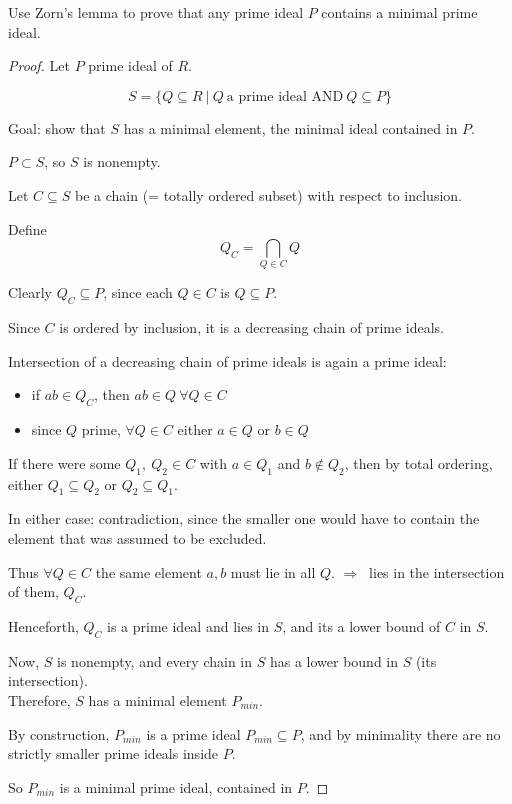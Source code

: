 \documentclass{article}
\theoremstyle{definition}
\newenvironment{ex}[1]
{\renewcommand\theinnerex{#1}\innerex}
{\endinnerex}
\begin{document}
\begin{ex}{R.1.18}
  Use Zorn's lemma to prove that any prime ideal $P$ contains a minimal prime ideal.
\end{ex}
\begin{proof}
  Let $P$ prime ideal of $R$.

  $$S = \{ Q \subseteq R ~|~ Q ~\text{a prime ideal AND}~ Q \subseteq P \}$$

  Goal: show that $S$ has a minimal element, the minimal ideal contained in $P$.

  $P \subset S$, so $S$ is nonempty.

  Let $C \subseteq S$ be a chain (= totally ordered subset) with respect to inclusion.

  Define
  $$Q_C = \bigcap_{Q \in C} Q$$

  Clearly $Q_C \subseteq P$, since each $Q \in C$ is $Q \subseteq P$.

  Since $C$ is ordered by inclusion, it is a decreasing chain of prime ideals.

  Intersection of a decreasing chain of prime ideals is again a prime ideal:
  \begin{itemize}
    \item[-] if $ab \in Q_C$, then $ab \in Q ~\forall Q \in C$
    \item[-] since $Q$ prime, $\forall Q \in C$ either $a \in Q$ or $b \in Q$
  \end{itemize}

  If there were some $Q_1,~ Q_2 \in C$ with $a \in Q_1$ and $b \not\in Q_2$, then by total ordering, either $Q_1 \subseteq Q_2$ or $Q_2 \subseteq Q_1$.

  In either case: contradiction, since the smaller one would have to contain the element that was assumed to be excluded.

  Thus $\forall Q \in C$ the same element $a, b$ must lie in all $Q$. $\Longrightarrow~$ lies in the intersection of them, $Q_C$.

  Henceforth, $Q_C$ is a prime ideal and lies in $S$, and its a lower bound of $C$ in $S$.

  Now, $S$ is nonempty, and every chain in $S$ has a lower bound in $S$ (its intersection).\\
  Therefore, $S$ has a minimal element $P_{min}$.

  By construction, $P_{min}$ is a prime ideal $P_{min} \subseteq P$, and by minimality there are no strictly smaller prime ideals inside $P$.

  So $P_{min}$ is a minimal prime ideal, contained in $P$.
\end{proof}
\end{document}
